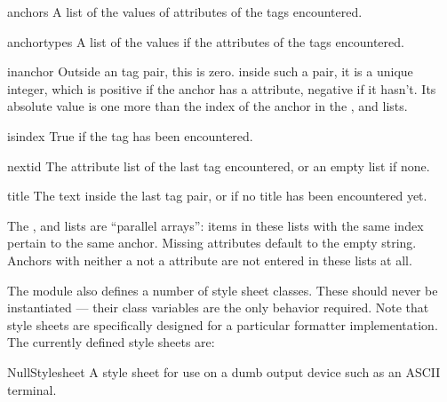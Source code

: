 \begin{datadesc}{anchors}
A list of the values of  attributes of the  tags
encountered.
\end{datadesc}

\begin{datadesc}{anchortypes}
A list of the values if the  attributes of the 
tags encountered.
\end{datadesc}

\begin{datadesc}{inanchor}
Outside an  tag pair, this is zero.  inside such a
pair, it is a unique integer, which is positive if the anchor has a
 attribute, negative if it hasn't.  Its absolute value is
one more than the index of the anchor in the ,
 and  lists.
\end{datadesc}

\begin{datadesc}{isindex}
True if the  tag has been encountered.
\end{datadesc}

\begin{datadesc}{nextid}
The attribute list of the last  tag encountered, or
an empty list if none.
\end{datadesc}

\begin{datadesc}{title}
The text inside the last  tag pair, or
 if no title has been encountered yet.
\end{datadesc}

The ,  and  lists
are ``parallel arrays'': items in these lists with the same index
pertain to the same anchor.  Missing attributes default to the empty
string.  Anchors with neither a  not a 
attribute are not entered in these lists at all.

The module also defines a number of style sheet classes.  These should
never be instantiated --- their class variables are the only behavior
required.  Note that style sheets are specifically designed for a
particular formatter implementation.  The currently defined style
sheets are:

\begin{datadesc}{NullStylesheet}
A style sheet for use on a dumb output device such as an ASCII
terminal.
\end{datadesc}

